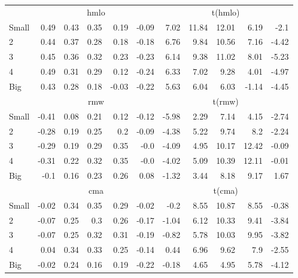 \begin{table}[!ht]
\begin{tabular}{lrrrrrrrrrr}
  

      & \multicolumn{5}{c}{hmlo} & \multicolumn{5}{c}{t(hmlo)} \\
    \cmidrule(r){2-6} \cmidrule(r){7-11}
      Small  & 0.49  & 0.43  & 0.35  & 0.19  & -0.09   & 7.02  & 11.84  & 12.01  & 6.19  & -2.1  \\
          2  & 0.44  & 0.37  & 0.28  & 0.18  & -0.18   & 6.76  & 9.84  & 10.56  & 7.16  & -4.42  \\
          3  & 0.45  & 0.36  & 0.32  & 0.23  & -0.23   & 6.14  & 9.38  & 11.02  & 8.01  & -5.23  \\
          4  & 0.49  & 0.31  & 0.29  & 0.12  & -0.24   & 6.33  & 7.02  & 9.28  & 4.01  & -4.97  \\
      Big    & 0.43  & 0.28  & 0.18  & -0.03  & -0.22   & 5.63  & 6.04  & 6.03  & -1.14  & -4.45  \\

  

      & \multicolumn{5}{c}{rmw} & \multicolumn{5}{c}{t(rmw)} \\
    \cmidrule(r){2-6} \cmidrule(r){7-11}
      Small  & -0.41  & 0.08  & 0.21  & 0.12  & -0.12   & -5.98  & 2.29  & 7.14  & 4.15  & -2.74  \\
          2  & -0.28  & 0.19  & 0.25  & 0.2  & -0.09   & -4.38  & 5.22  & 9.74  & 8.2  & -2.24  \\
          3  & -0.29  & 0.19  & 0.29  & 0.35  & -0.0   & -4.09  & 4.95  & 10.17  & 12.42  & -0.09  \\
          4  & -0.31  & 0.22  & 0.32  & 0.35  & -0.0   & -4.02  & 5.09  & 10.39  & 12.11  & -0.01  \\
      Big    & -0.1  & 0.16  & 0.23  & 0.26  & 0.08   & -1.32  & 3.44  & 8.18  & 9.17  & 1.67  \\

  

      & \multicolumn{5}{c}{cma} & \multicolumn{5}{c}{t(cma)} \\
    \cmidrule(r){2-6} \cmidrule(r){7-11}
      Small  & -0.02  & 0.34  & 0.35  & 0.29  & -0.02   & -0.2  & 8.55  & 10.87  & 8.55  & -0.38  \\
          2  & -0.07  & 0.25  & 0.3  & 0.26  & -0.17   & -1.04  & 6.12  & 10.33  & 9.41  & -3.84  \\
          3  & -0.07  & 0.25  & 0.32  & 0.31  & -0.19   & -0.82  & 5.78  & 10.03  & 9.95  & -3.82  \\
          4  & 0.04  & 0.34  & 0.33  & 0.25  & -0.14   & 0.44  & 6.96  & 9.62  & 7.9  & -2.55  \\
      Big    & -0.02  & 0.24  & 0.16  & 0.19  & -0.22   & -0.18  & 4.65  & 4.95  & 5.78  & -4.12  \\

  

  \bottomrule
\end{tabular}
\label{tbl:25_Size_Mom_FF2015}
\end{table}
